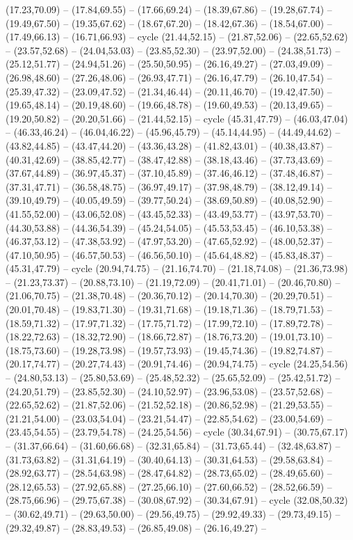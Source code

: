 {(17.23,70.09) -- (17.84,69.55) -- (17.66,69.24) -- (18.39,67.86) -- (19.28,67.74) -- (19.49,67.50) -- (19.35,67.62) -- (18.67,67.20) -- (18.42,67.36) -- (18.54,67.00) -- (17.49,66.13) -- (16.71,66.93) -- cycle (21.44,52.15) -- (21.87,52.06) -- (22.65,52.62) -- (23.57,52.68) -- (24.04,53.03) -- (23.85,52.30) -- (23.97,52.00) -- (24.38,51.73) -- (25.12,51.77) -- (24.94,51.26) -- (25.50,50.95) -- (26.16,49.27) -- (27.03,49.09) -- (26.98,48.60) -- (27.26,48.06) -- (26.93,47.71) -- (26.16,47.79) -- (26.10,47.54) -- (25.39,47.32) -- (23.09,47.52) -- (21.34,46.44) -- (20.11,46.70) -- (19.42,47.50) -- (19.65,48.14) -- (20.19,48.60) -- (19.66,48.78) -- (19.60,49.53) -- (20.13,49.65) -- (19.20,50.82) -- (20.20,51.66) -- (21.44,52.15) -- cycle (45.31,47.79) -- (46.03,47.04) -- (46.33,46.24) -- (46.04,46.22) -- (45.96,45.79) -- (45.14,44.95) -- (44.49,44.62) -- (43.82,44.85) -- (43.47,44.20) -- (43.36,43.28) -- (41.82,43.01) -- (40.38,43.87) -- (40.31,42.69) -- (38.85,42.77) -- (38.47,42.88) -- (38.18,43.46) -- (37.73,43.69) -- (37.67,44.89) -- (36.97,45.37) -- (37.10,45.89) -- (37.46,46.12) -- (37.48,46.87) -- (37.31,47.71) -- (36.58,48.75) -- (36.97,49.17) -- (37.98,48.79) -- (38.12,49.14) -- (39.10,49.79) -- (40.05,49.59) -- (39.77,50.24) -- (38.69,50.89) -- (40.08,52.90) -- (41.55,52.00) -- (43.06,52.08) -- (43.45,52.33) -- (43.49,53.77) -- (43.97,53.70) -- (44.30,53.88) -- (44.36,54.39) -- (45.24,54.05) -- (45.53,53.45) -- (46.10,53.38) -- (46.37,53.12) -- (47.38,53.92) -- (47.97,53.20) -- (47.65,52.92) -- (48.00,52.37) -- (47.10,50.95) -- (46.57,50.53) -- (46.56,50.10) -- (45.64,48.82) -- (45.83,48.37) -- (45.31,47.79) -- cycle (20.94,74.75) -- (21.16,74.70) -- (21.18,74.08) -- (21.36,73.98) -- (21.23,73.37) -- (20.88,73.10) -- (21.19,72.09) -- (20.41,71.01) -- (20.46,70.80) -- (21.06,70.75) -- (21.38,70.48) -- (20.36,70.12) -- (20.14,70.30) -- (20.29,70.51) -- (20.01,70.48) -- (19.83,71.30) -- (19.31,71.68) -- (19.18,71.36) -- (18.79,71.53) -- (18.59,71.32) -- (17.97,71.32) -- (17.75,71.72) -- (17.99,72.10) -- (17.89,72.78) -- (18.22,72.63) -- (18.32,72.90) -- (18.66,72.87) -- (18.76,73.20) -- (19.01,73.10) -- (18.75,73.60) -- (19.28,73.98) -- (19.57,73.93) -- (19.45,74.36) -- (19.82,74.87) -- (20.17,74.77) -- (20.27,74.43) -- (20.91,74.46) -- (20.94,74.75) -- cycle (24.25,54.56) -- (24.80,53.13) -- (25.80,53.69) -- (25.48,52.32) -- (25.65,52.09) -- (25.42,51.72) -- (24.20,51.79) -- (23.85,52.30) -- (24.10,52.97) -- (23.96,53.08) -- (23.57,52.68) -- (22.65,52.62) -- (21.87,52.06) -- (21.52,52.18) -- (20.86,52.98) -- (21.29,53.55) -- (21.21,54.00) -- (23.03,54.04) -- (23.21,54.47) -- (22.85,54.62) -- (23.00,54.69) -- (23.45,54.55) -- (23.79,54.78) -- (24.25,54.56) -- cycle (30.34,67.91) -- (30.75,67.17) -- (31.37,66.64) -- (31.60,66.68) -- (32.31,65.84) -- (31.73,65.44) -- (32.48,63.87) -- (31.73,63.82) -- (31.31,64.19) -- (30.40,64.13) -- (30.31,64.53) -- (29.58,63.84) -- (28.92,63.77) -- (28.54,63.98) -- (28.47,64.82) -- (28.73,65.02) -- (28.49,65.60) -- (28.12,65.53) -- (27.92,65.88) -- (27.25,66.10) -- (27.60,66.52) -- (28.52,66.59) -- (28.75,66.96) -- (29.75,67.38) -- (30.08,67.92) -- (30.34,67.91) -- cycle (32.08,50.32) -- (30.62,49.71) -- (29.63,50.00) -- (29.56,49.75) -- (29.92,49.33) -- (29.73,49.15) -- (29.32,49.87) -- (28.83,49.53) -- (26.85,49.08) -- (26.16,49.27) -- }
